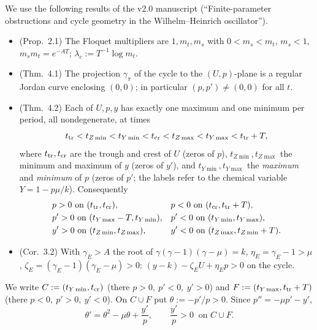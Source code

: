\documentclass[11pt,a4paper]{article}
\theoremstyle{remark}\newtheorem{remark}[theorem]{Remark}
\begin{document}
We use the following results of the v2.0 manuscript (``Finite-parameter obstructions and cycle
geometry in the Wilhelm--Heinrich oscillator'').
\begin{itemize}
\item[(F1)] (Prop.~2.1) The Floquet multipliers are $1,m_t,m_s$ with $0<m_s<m_t$, $m_s<1$,
$m_sm_t=e^{-AT}$; $\lambda_c:=T^{-1}\log m_t$.
\item[(F2)] (Thm.~4.1) The projection $\gamma_\pi$ of the cycle to the $(U,p)$-plane is a regular
Jordan curve enclosing $(0,0)$; in particular $(p,p')\neq(0,0)$ for all $t$.
\item[(F3)] (Thm.~4.2) Each of $U,p,y$ has exactly one maximum and one minimum per period, all
nondegenerate, at times
\[
t_{\rm tr}<t_{Z\min}<t_{Y\min}<t_{\rm cr}<t_{Z\max}<t_{Y\max}<t_{\rm tr}+T ,
\]
where $t_{\rm tr},t_{\rm cr}$ are the trough and crest of $U$ (zeros of $p$), $t_{Z\min},t_{Z\max}$
the minimum and maximum of $y$ (zeros of $y'$), and $t_{Y\min},t_{Y\max}$ the \emph{maximum} and
\emph{minimum} of $p$ (zeros of $p'$; the labels refer to the chemical variable $Y=1-p\mu/k$).
Consequently
\begin{align*}
&p>0\text{ on }(t_{\rm tr},t_{\rm cr}),&&p<0\text{ on }(t_{\rm cr},t_{\rm tr}+T),\\
&p'>0\text{ on }(t_{Y\max}-T,t_{Y\min}),&&p'<0\text{ on }(t_{Y\min},t_{Y\max}),\\
&y'>0\text{ on }(t_{Z\min},t_{Z\max}),&&y'<0\text{ on }(t_{Z\max},t_{Z\min}+T).
\end{align*}
\item[(F4)] (Cor.~3.2) With $\gamma_E>A$ the root of $\gamma(\gamma-1)(\gamma-\mu)=k$,
$\eta_E=\gamma_E-1>\mu$, $\zeta_E=(\gamma_E-1)(\gamma_E-\mu)>0$:
$(y-k)-\zeta_EU+\eta_Ep>0$ on the cycle.
\end{itemize}
We write $C:=(t_{Y\min},t_{\rm cr})$ (there $p>0,\ p'<0,\ y'>0$) and
$F:=(t_{Y\max},t_{\rm tr}+T)$ (there $p<0,\ p'>0,\ y'<0$). On $C\cup F$ put
$\theta:=-p'/p>0$. Since $p''=-\mu p'-y'$,
\begin{equation}\label{theta}
\theta'=\theta^2-\mu\theta+\frac{y'}{p},\qquad \frac{y'}{p}>0\ \text{ on }C\cup F .
\end{equation}
\end{document}
